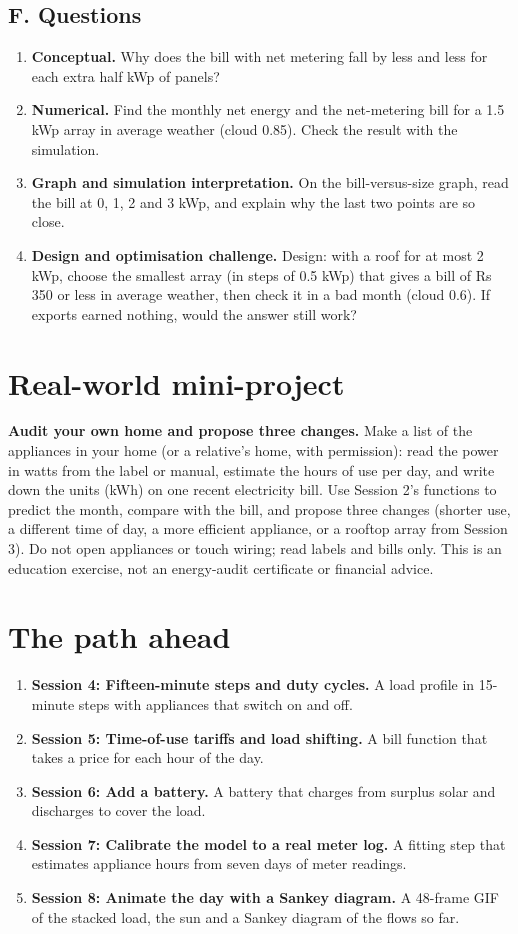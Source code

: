 \documentclass[11pt,a4paper]{article}
\begin{document}
\subsection*{F. Questions}
\begin{enumerate}[nosep]
\item \textbf{Conceptual.} Why does the bill with net metering fall by less and less for each extra half kWp of panels?
\item \textbf{Numerical.} Find the monthly net energy and the net-metering bill for a 1.5 kWp array in average weather (cloud 0.85). Check the result with the simulation.
\item \textbf{Graph and simulation interpretation.} On the bill-versus-size graph, read the bill at 0, 1, 2 and 3 kWp, and explain why the last two points are so close.
\item \textbf{Design and optimisation challenge.} Design: with a roof for at most 2 kWp, choose the smallest array (in steps of 0.5 kWp) that gives a bill of Rs 350 or less in average weather, then check it in a bad month (cloud 0.6). If exports earned nothing, would the answer still work?
\end{enumerate}

\section{Real-world mini-project}
\textbf{Audit your own home and propose three changes.} Make a list of the appliances in your home (or a relative's home, with permission): read the power in watts from the label or manual, estimate the hours of use per day, and write down the units (kWh) on one recent electricity bill. Use Session 2's functions to predict the month, compare with the bill, and propose three changes (shorter use, a different time of day, a more efficient appliance, or a rooftop array from Session 3). Do not open appliances or touch wiring; read labels and bills only. This is an education exercise, not an energy-audit certificate or financial advice.

\section{The path ahead}
\begin{enumerate}[nosep]
\item \textbf{Session 4: Fifteen-minute steps and duty cycles.} A load profile in 15-minute steps with appliances that switch on and off.
\item \textbf{Session 5: Time-of-use tariffs and load shifting.} A bill function that takes a price for each hour of the day.
\item \textbf{Session 6: Add a battery.} A battery that charges from surplus solar and discharges to cover the load.
\item \textbf{Session 7: Calibrate the model to a real meter log.} A fitting step that estimates appliance hours from seven days of meter readings.
\item \textbf{Session 8: Animate the day with a Sankey diagram.} A 48-frame GIF of the stacked load, the sun and a Sankey diagram of the flows so far.
\end{enumerate}
\end{document}
